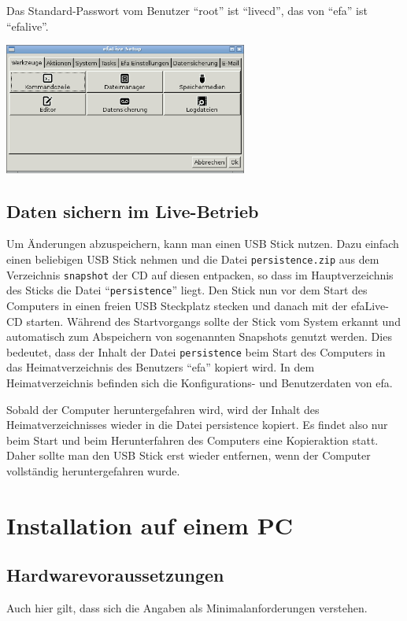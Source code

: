 \documentclass[a4paper,12pt,twoside]{article}
\begin{document}
Das Standard-Passwort vom Benutzer "`root"' ist "`livecd"', das von
"`efa"' ist "`efalive"'.

\bigskip
\begin{minipage}{\linewidth}
    \centering
    \captionsetup{type=figure}
    \includegraphics[width=8cm]{screenshots/efalive_setup.png}
    \label{fig:efalivesetup_live}
\end{minipage}


\subsection{Daten sichern im Live-Betrieb}
\label{sct:live_sichern}
Um Änderungen abzuspeichern, kann man einen USB Stick nutzen. Dazu
einfach einen beliebigen USB Stick nehmen und die Datei \texttt{persistence.zip}
aus dem Verzeichnis \texttt{snapshot} der CD auf diesen entpacken, so dass im
Hauptverzeichnis des Sticks die Datei "`\texttt{persistence}"' liegt. Den Stick nun
vor dem Start des Computers in einen freien USB Steckplatz stecken und
danach mit der efaLive-CD starten. Während des Startvorgangs sollte der
Stick vom System erkannt und automatisch zum Abspeichern von
sogenannten Snapshots genutzt werden. Dies bedeutet, dass der Inhalt
der Datei \texttt{persistence} beim Start des Computers in das Heimatverzeichnis
des Benutzers "`efa"' kopiert wird. In dem
Heimatverzeichnis befinden sich die Konfigurations- und Benutzerdaten
von efa.

Sobald der Computer heruntergefahren wird, wird der Inhalt des
Heimatverzeichnisses wieder in die Datei persistence kopiert. Es findet
also nur beim Start und beim Herunterfahren des Computers eine
Kopieraktion statt. Daher sollte man den USB Stick erst wieder
entfernen, wenn der Computer vollständig heruntergefahren wurde.


\section{Installation auf einem PC}
\label{sct:installation_pc}
\subsection{Hardwarevoraussetzungen}
\label{sct:inst_hardware}
Auch hier gilt, dass sich die Angaben als Minimalanforderungen
verstehen.
\end{document}
